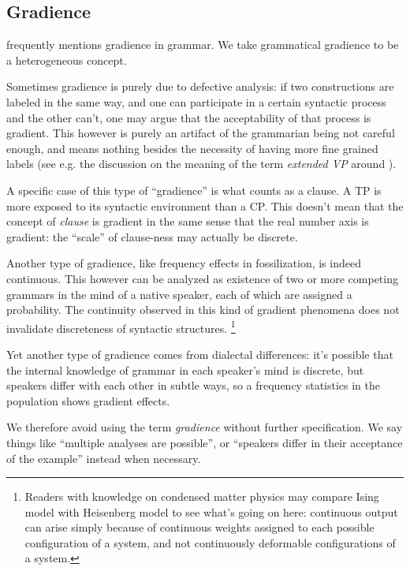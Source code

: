 \documentclass[UTF8, a4paper, oneside, scheme=plain, 12pt]{ctexrep}
\newcommand*{\term}[1]{\emph{#1}}
\begin{document}
{\subsection{Gradience}\label{sec:theory.gradience}

\citet{quirk1985} frequently mentions gradience in grammar.
We take grammatical gradience to be a heterogeneous concept.

Sometimes gradience is purely due to defective analysis:
if two constructions are labeled in the same way,
and one can participate in a certain syntactic process and the other can't,
one may argue that the acceptability of that process is gradient.
This however is purely an artifact of the grammarian being not careful enough,
and means nothing besides the necessity of having more fine grained labels
(see e.g. the discussion on the meaning of the term \term{extended VP} around ).

A specific case of this type of ``gradience'' is what counts as a clause.
A TP is more exposed to its syntactic environment than a CP.
This doesn't mean that the concept of \term{clause} is gradient
in the same sense that the real number axis is gradient:
the ``scale'' of clause-ness may actually be discrete.

Another type of gradience, like frequency effects in fossilization, is indeed continuous.
This however can be analyzed as existence of two or more competing grammars in the mind of a native speaker,
each of which are assigned a probability.
The continuity observed in this kind of gradient phenomena
does not invalidate discreteness of syntactic structures.%
\footnote{
    Readers with knowledge on condensed matter physics may compare Ising model with Heisenberg model
    to see what's going on here:
    continuous output can arise simply because of continuous weights assigned to each possible configuration of a system,
    and not continuously deformable configurations of a system.
}

Yet another type of gradience comes from dialectal differences:
it's possible that the internal knowledge of grammar in each speaker's mind is discrete,
but speakers differ with each other in subtle ways,
so a frequency statistics in the population shows gradient effects.

We therefore avoid using the term \term{gradience} without further specification.
We say things like ``multiple analyses are possible'', or ``speakers differ in their acceptance of the example'' instead when necessary.

}
\end{document}
